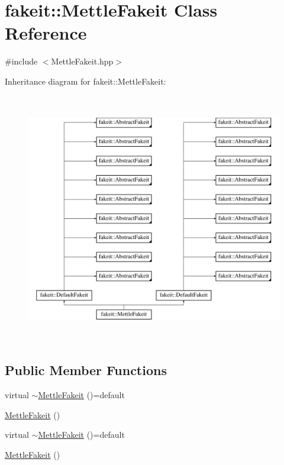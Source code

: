 \hypertarget{classfakeit_1_1MettleFakeit}{}\section{fakeit\+::Mettle\+Fakeit Class Reference}
\label{classfakeit_1_1MettleFakeit}


{\ttfamily \#include $<$Mettle\+Fakeit.\+hpp$>$}

Inheritance diagram for fakeit\+::Mettle\+Fakeit\+:\begin{figure}[H]
\begin{center}
\leavevmode
\includegraphics[height=11.000000cm]{classfakeit_1_1MettleFakeit}
\end{center}
\end{figure}
\subsection*{Public Member Functions}
\begin{DoxyCompactItemize}
\item 
virtual \mbox{\hyperlink{classfakeit_1_1MettleFakeit_acc3b582d321321935850e554ba1d16a9}{$\sim$\+Mettle\+Fakeit}} ()=default
\item 
\mbox{\hyperlink{classfakeit_1_1MettleFakeit_aff1480f33440c42d7d102e269a2fd4bf}{Mettle\+Fakeit}} ()
\item 
virtual \mbox{\hyperlink{classfakeit_1_1MettleFakeit_acc3b582d321321935850e554ba1d16a9}{$\sim$\+Mettle\+Fakeit}} ()=default
\item 
\mbox{\hyperlink{classfakeit_1_1MettleFakeit_aff1480f33440c42d7d102e269a2fd4bf}{Mettle\+Fakeit}} ()
\end{DoxyCompactItemize}
